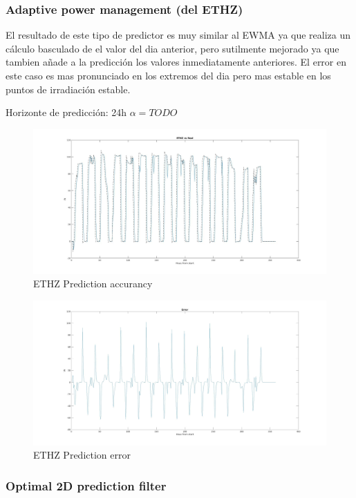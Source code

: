 \subsubsection{Adaptive power management (del ETHZ)}
 \label{ssub:adaptive_power_management}

El resultado de este tipo de predictor es muy similar al EWMA ya que realiza un cálculo basculado de el valor del dia anterior, pero sutilmente mejorado ya que tambien añade a la predicción los valores inmediatamente anteriores. El error en este caso es mas pronunciado en los extremos del dia pero mas estable en los puntos de irradiación estable.

Horizonte de predicción: 24h
$\alpha = TODO$

\begin{figure}[h]
    \includegraphics[width=\textwidth]{ETHZ.jpg}
    \caption{ETHZ Prediction accurancy}
    \label{fig:ethz_comp}
\end{figure}

\begin{figure}[h]
    \includegraphics[width=\textwidth]{ETHZ_error.jpg}
    \caption{ETHZ Prediction error}
    \label{fig:ethz_error}
\end{figure}


\subsubsection{Optimal 2D prediction filter} 
\label{ssub:optimal_2d_prediction_filter}



